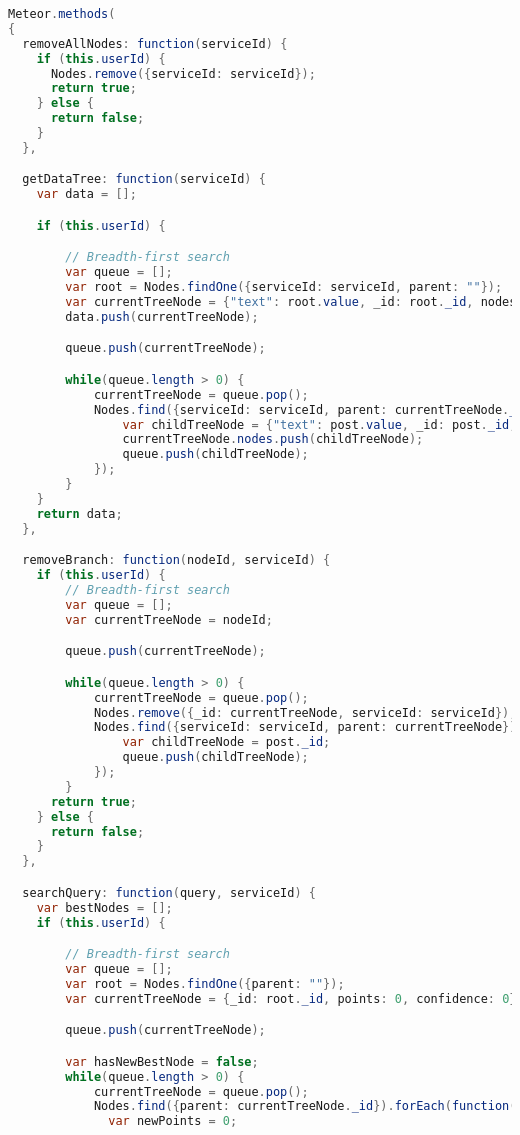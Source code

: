 \begin{lstlisting}[language=java]
Meteor.methods(
{
  removeAllNodes: function(serviceId) {
    if (this.userId) {
      Nodes.remove({serviceId: serviceId});
      return true;
    } else {
      return false;
    }
  },

  getDataTree: function(serviceId) {
    var data = [];

    if (this.userId) {

        // Breadth-first search
        var queue = [];
        var root = Nodes.findOne({serviceId: serviceId, parent: ""});
        var currentTreeNode = {"text": root.value, _id: root._id, nodes: []};
        data.push(currentTreeNode);

        queue.push(currentTreeNode);

        while(queue.length > 0) {
            currentTreeNode = queue.pop();
            Nodes.find({serviceId: serviceId, parent: currentTreeNode._id}).forEach(function(post){
                var childTreeNode = {"text": post.value, _id: post._id, nodes: []};
                currentTreeNode.nodes.push(childTreeNode);
                queue.push(childTreeNode);
            });
        }
    }
    return data;
  },

  removeBranch: function(nodeId, serviceId) {
    if (this.userId) {
        // Breadth-first search
        var queue = [];
        var currentTreeNode = nodeId;

        queue.push(currentTreeNode);

        while(queue.length > 0) {
            currentTreeNode = queue.pop();
            Nodes.remove({_id: currentTreeNode, serviceId: serviceId});
            Nodes.find({serviceId: serviceId, parent: currentTreeNode}).forEach(function(post){
                var childTreeNode = post._id;
                queue.push(childTreeNode);
            });
        }
      return true;
    } else {
      return false;
    }
  },

  searchQuery: function(query, serviceId) {
    var bestNodes = [];
    if (this.userId) {

        // Breadth-first search
        var queue = [];
        var root = Nodes.findOne({parent: ""});
        var currentTreeNode = {_id: root._id, points: 0, confidence: 0};

        queue.push(currentTreeNode);

        var hasNewBestNode = false;
        while(queue.length > 0) {
            currentTreeNode = queue.pop();
            Nodes.find({parent: currentTreeNode._id}).forEach(function(post){
              var newPoints = 0;


\end{lstlisting}
